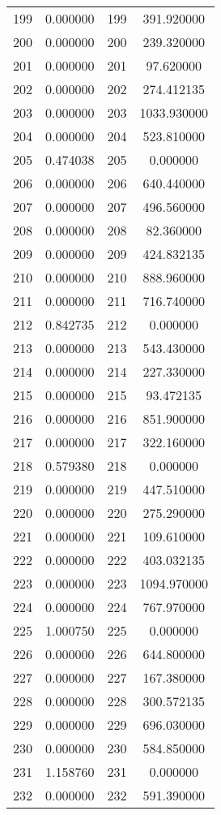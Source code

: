 \documentclass[12pt]{article}
\begin{document}
\begin{longtable}{@{}cccc@{}}
199 & 0.000000 & 199 & 391.920000 \\
200 & 0.000000 & 200 & 239.320000 \\
201 & 0.000000 & 201 & 97.620000 \\
202 & 0.000000 & 202 & 274.412135 \\
203 & 0.000000 & 203 & 1033.930000 \\
204 & 0.000000 & 204 & 523.810000 \\
205 & 0.474038 & 205 & 0.000000 \\
206 & 0.000000 & 206 & 640.440000 \\
207 & 0.000000 & 207 & 496.560000 \\
208 & 0.000000 & 208 & 82.360000 \\
209 & 0.000000 & 209 & 424.832135 \\
210 & 0.000000 & 210 & 888.960000 \\
211 & 0.000000 & 211 & 716.740000 \\
212 & 0.842735 & 212 & 0.000000 \\
213 & 0.000000 & 213 & 543.430000 \\
214 & 0.000000 & 214 & 227.330000 \\
215 & 0.000000 & 215 & 93.472135 \\
216 & 0.000000 & 216 & 851.900000 \\
217 & 0.000000 & 217 & 322.160000 \\
218 & 0.579380 & 218 & 0.000000 \\
219 & 0.000000 & 219 & 447.510000 \\
220 & 0.000000 & 220 & 275.290000 \\
221 & 0.000000 & 221 & 109.610000 \\
222 & 0.000000 & 222 & 403.032135 \\
223 & 0.000000 & 223 & 1094.970000 \\
224 & 0.000000 & 224 & 767.970000 \\
225 & 1.000750 & 225 & 0.000000 \\
226 & 0.000000 & 226 & 644.800000 \\
227 & 0.000000 & 227 & 167.380000 \\
228 & 0.000000 & 228 & 300.572135 \\
229 & 0.000000 & 229 & 696.030000 \\
230 & 0.000000 & 230 & 584.850000 \\
231 & 1.158760 & 231 & 0.000000 \\
232 & 0.000000 & 232 & 591.390000 \\

\end{longtable}
\end{document}
